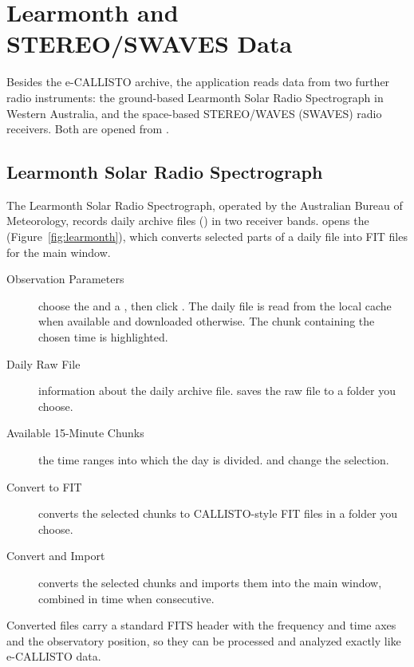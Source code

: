 \chapter{Learmonth and STEREO/SWAVES Data}
\label{ch:other-radio}

Besides the e-CALLISTO archive, the application reads data from two further radio
instruments: the ground-based Learmonth Solar Radio Spectrograph in Western Australia, and
the space-based STEREO/WAVES (SWAVES) radio receivers. Both are opened from
.

\section{Learmonth Solar Radio Spectrograph}
\label{sec:learmonth}

The Learmonth Solar Radio Spectrograph, operated by the Australian Bureau of Meteorology,
records daily archive files () in two receiver bands.  opens the 
(Figure~\ref{fig:learmonth}), which converts selected parts of a daily file into FIT files
for the main window.


\begin{description}
  \item[Observation Parameters] choose the  and a , then click
    . The daily file is read from the local cache when available
    and downloaded otherwise. The chunk containing the chosen time is highlighted.
  \item[Daily Raw File] information about the daily archive file.  saves
    the raw  file to a folder you choose.
  \item[Available 15-Minute Chunks] the time ranges into which the day is divided.
     and  change the selection.
  \item[Convert to FIT] converts the selected chunks to CALLISTO-style FIT files in a folder
    you choose.
  \item[Convert and Import] converts the selected chunks and imports them into the main
    window, combined in time when consecutive.
\end{description}
Converted files carry a standard FITS header with the frequency and time axes and the
observatory position, so they can be processed and analyzed exactly like e-CALLISTO data.

